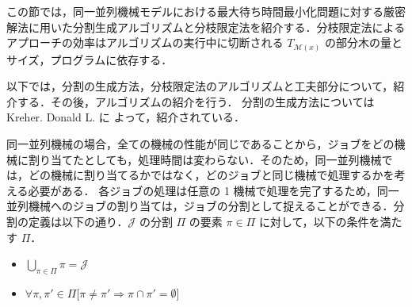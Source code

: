 \documentclass[12pt]{optlab-bachelor}
\begin{document}

この節では，同一並列機械モデルにおける最大待ち時間最小化問題に対する厳密解法に用いた分割生成アルゴリズムと分枝限定法を紹介する．分枝限定法によるアプローチの効率はアルゴリズムの実行中に切断される $T_{\mathcal{M}(x)}$ の部分木の量とサイズ，プログラムに依存する．%

以下では，分割の生成方法，分枝限定法のアルゴリズムと工夫部分について，紹介する．その後，アルゴリズムの紹介を行う．
分割の生成方法については Kreher. Donald L. \cite{rgf} に
よって，紹介されている．

同一並列機械の場合，全ての機械の性能が同じであることから，ジョブをどの機械に割り当てたとしても，処理時間は変わらない．そのため，同一並列機械では，どの機械に割り当てるかではなく，どのジョブと同じ機械で処理するかを考える必要がある．
各ジョブの処理は任意の 1 機械で処理を完了するため，同一並列機械へのジョブの割り当ては，ジョブの分割として捉えることができる．分割の定義は以下の通り．$\mathcal{J}$ の分割 $\Pi$ の要素 $\pi \in \Pi$ に対して，以下の条件を満たす $\Pi$．
\begin{itemize}
  \item $\displaystyle \bigcup_{\pi \in \Pi}\pi = \mathcal{J} $
  \item $\forall \pi, \pi' \in \Pi \big[\pi \neq \pi' \Rightarrow \pi \cap \pi' = \emptyset \big]$
\end{itemize}
\end{document}
